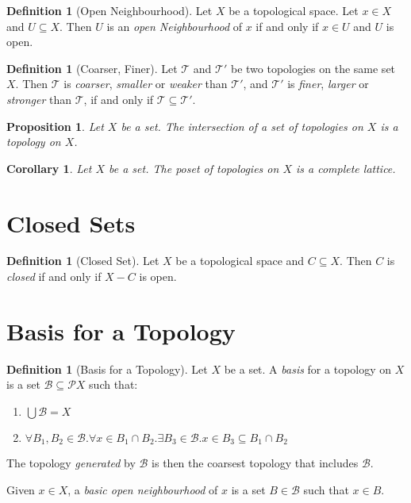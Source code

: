 \documentclass{book}
\newtheorem{corollary}{Corollary}[lemma]
\newtheorem{proposition}[lemma]{Proposition}
\theoremstyle{definition}
\newtheorem{definition}[lemma]{Definition}
\newcommand{\BB}{\ensuremath{\mathcal{B}}}
\newcommand{\PP}{\ensuremath{\mathcal{P}}}
\newcommand{\TT}{\ensuremath{\mathcal{T}}}
\newcommand{\pow}[1]{\ensuremath{\PP {#1}}}
\begin{document}
\begin{definition}[Open Neighbourhood]
    Let $X$ be a topological space. Let $x \in X$ and $U \subseteq X$. Then $U$ is an \emph{open Neighbourhood}
    of $x$ if and only if $x \in U$ and $U$ is open.
\end{definition}

\begin{definition}[Coarser, Finer]
    Let $\TT$ and $\TT'$ be two topologies on the same set $X$. Then $\TT$ is \emph{coarser}, \emph{smaller} or \emph{weaker} than $\TT'$,
    and $\TT'$ is \emph{finer}, \emph{larger} or \emph{stronger} than $\TT$, if and only if $\TT \subseteq \TT'$.
\end{definition}

\begin{proposition}
    Let $X$ be a set. The intersection of a set of topologies on $X$ is a topology on $X$.
\end{proposition}

\begin{corollary}
    Let $X$ be a set. The poset of topologies on $X$ is a complete lattice.
\end{corollary}

\section{Closed Sets}

\begin{definition}[Closed Set]
    Let $X$ be a topological space and $C \subseteq X$. Then $C$ is \emph{closed} if and only if $X - C$ is open.
\end{definition}

\section{Basis for a Topology}

\begin{definition}[Basis for a Topology]
    Let $X$ be a set. A \emph{basis} for a topology on $X$ is a set $\BB \subseteq \pow{X}$ such that:
    \begin{enumerate}
        \item $\bigcup \BB = X$
        \item $\forall B_1, B_2 \in \BB. \forall x \in B_1 \cap B_2. \exists B_3 \in \BB. x \in B_3 \subseteq B_1 \cap B_2$
    \end{enumerate}

    The topology \emph{generated} by $\BB$ is then the coarsest topology that includes $\BB$.

    Given $x \in X$, a \emph{basic open neighbourhood} of $x$ is a set $B \in \BB$ such that $x \in B$.
\end{definition}
\end{document}
